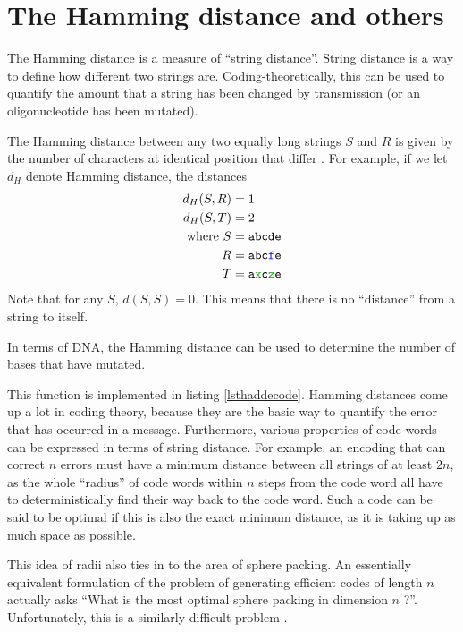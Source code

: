 \documentclass[a4paper,11pt]{article}
\begin{document}
    \section{The Hamming distance and others}

    The Hamming distance is a measure of ``string distance''. String
    distance is a way to define how different two strings are.
    Coding-theoretically, this can be used to quantify the amount that a
    string has been changed by transmission (or an oligonucleotide has been
    mutated).

    The Hamming distance between any two equally long strings $S$ and $R$
    is given by the number of characters at identical position that differ
    \cite{Codes1950Hamming,FuzzyDistance1977SGarro}.
    For example, if we let $d_H$ denote Hamming distance, the distances
    \begin{align*}
    d_H(S, R) &= 1\\
    d_H(S, T) &= 2\\
    \text{where}\
    S &= \texttt{abcde}\\
    R &= \texttt{abc\textcolor{blue}{f}e}\\
    T &= \texttt{a\textcolor{codegreen}{x}c\textcolor{codegreen}{z}e}
    \end{align*}
    Note that for any $S$, $d(S, S) = 0$. This means that there is no
    ``distance'' from a string to itself.

    In terms of DNA, the Hamming distance can be used to determine the
    number of bases that have mutated.

    This function is implemented in listing \ref{lsthaddecode}. Hamming
    distances come up a lot in coding theory, because they are the basic way to
    quantify the error that has occurred in a message. Furthermore, various
    properties of code words can be expressed in terms of string distance. For
    example, an encoding that can correct $n$ errors must have a minimum
    distance between all strings of at least $2n$, as the whole ``radius'' of
    code words within $n$ steps from the code word all have to deterministically
    find their way back to the code word. Such a code can be said to be optimal
    if this is also the exact minimum distance, as it is taking up as much space
    as possible.

    This idea of radii also ties in to the area of sphere packing. An
    essentially equivalent formulation of the problem
    \cite{HighDensityPackings2011OToole} of generating
    efficient codes of length $n$ actually asks ``What is the most optimal
    sphere packing in dimension $n$ \cite{PackingCurvature1978Boroczky}?''. Unfortunately, this is a
    similarly difficult problem
    \cite{SphereTheorems1947Rogers,SphereUpperBounds2014DeLaat}.
\end{document}
